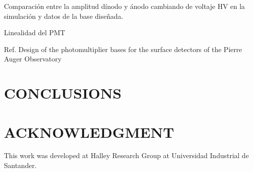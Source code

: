 \documentclass[letterpaper, 10 pt, conference]{ieeeconf}  %
\begin{document}
Comparación entre la amplitud dínodo y ánodo cambiando de voltaje HV en la simulación y datos de la base diseñada.

Linealidad del PMT

Ref. Design of the photomultiplier bases for the surface detectors of the Pierre Auger Observatory
\section{CONCLUSIONS}


\addtolength{\textheight}{-12cm}   %









\section*{ACKNOWLEDGMENT}

This work was developed at Halley Research Group at Universidad Industrial de Santander.





\end{document}
